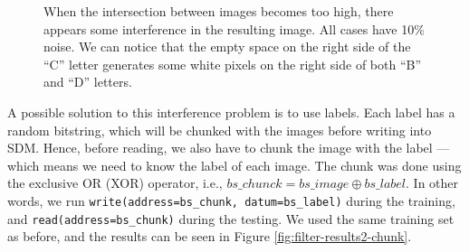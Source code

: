 \begin{figure}[!htb]
  \captionsetup[subfigure]{labelformat=empty}




  \caption{When the intersection between images becomes too high, there appears some interference in the resulting image. All cases have 10\% noise. We can notice that the empty space on the right side of the ``C'' letter generates some white pixels on the right side of both ``B'' and ``D'' letters.
  \label{fig:filter-results2}
  }
\end{figure}

A possible solution to this interference problem is to use labels. Each label has a random bitstring, which will be chunked with the images before writing into SDM. Hence, before reading, we also have to chunk the image with the label --- which means we need to know the label of each image. The chunk was done using the exclusive OR (XOR) operator, i.e., $bs\_chunck = bs\_image \oplus bs\_label$. In other words, we run \lstinline{write(address=bs_chunk, datum=bs_label)} during the training, and \lstinline{read(address=bs_chunk)} during the testing. We used the same training set as before, and the results can be seen in Figure \ref{fig:filter-results2-chunk}.

